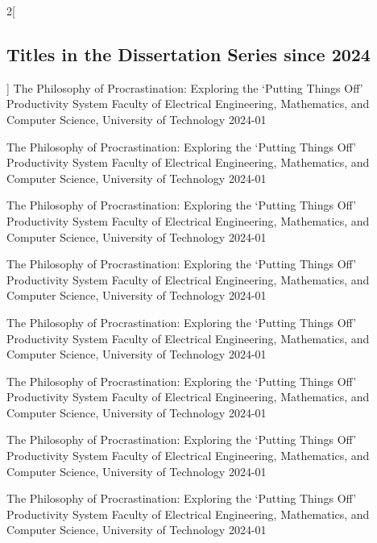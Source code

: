\begin{multicols*}{2}[\subsection*{Titles in the Dissertation Series since 2024}]
         {The Philosophy of Procrastination: Exploring the `Putting Things Off' Productivity System}
         {Faculty of Electrical Engineering, Mathematics, and Computer Science, University of Technology}
         {2024-01}

         {The Philosophy of Procrastination: Exploring the `Putting Things Off' Productivity System}
         {Faculty of Electrical Engineering, Mathematics, and Computer Science, University of Technology}
         {2024-01}

         {The Philosophy of Procrastination: Exploring the `Putting Things Off' Productivity System}
         {Faculty of Electrical Engineering, Mathematics, and Computer Science, University of Technology}
         {2024-01}

         {The Philosophy of Procrastination: Exploring the `Putting Things Off' Productivity System}
         {Faculty of Electrical Engineering, Mathematics, and Computer Science, University of Technology}
         {2024-01}

         {The Philosophy of Procrastination: Exploring the `Putting Things Off' Productivity System}
         {Faculty of Electrical Engineering, Mathematics, and Computer Science, University of Technology}
         {2024-01}

         {The Philosophy of Procrastination: Exploring the `Putting Things Off' Productivity System}
         {Faculty of Electrical Engineering, Mathematics, and Computer Science, University of Technology}
         {2024-01}

         {The Philosophy of Procrastination: Exploring the `Putting Things Off' Productivity System}
         {Faculty of Electrical Engineering, Mathematics, and Computer Science, University of Technology}
         {2024-01}

         {The Philosophy of Procrastination: Exploring the `Putting Things Off' Productivity System}
         {Faculty of Electrical Engineering, Mathematics, and Computer Science, University of Technology}
         {2024-01}


\end{multicols*}
